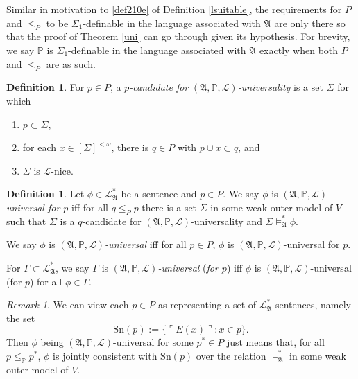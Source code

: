 \documentclass[12pt, twoside]{memoir}
\numberwithin{equation}{section}
\theoremstyle{definition}
\newtheorem{defi}[thm]{Definition}
\theoremstyle{remark}
\newtheorem{rem}[thm]{Remark}
\theoremstyle{definition}
\theoremstyle{definition}
\theoremstyle{definition}
\theoremstyle{remark}
\begin{document}
Similar in motivation to \ref{def210e} of Definition \ref{lsuitable}, the requirements for $P$ and $\leq_P$ to be $\Sigma_1$-definable in the language associated with $\mathfrak{A}$ are only there so that the proof of Theorem \ref{uni} can go through given its hypothesis. For brevity, we say $\mathbb{P}$ is $\Sigma_1$-definable in the language associated with $\mathfrak{A}$ exactly when both $P$ and $\leq_P$ are as such.

\begin{defi}
For $p \in P$, a $p$\emph{-candidate for} $(\mathfrak{A}, \mathbb{P}, \mathcal{L})$\emph{-universality} is a set $\Sigma$ for which
\begin{enumerate}[label=(\alph*)]
   \item $p \subset \Sigma$,
   \item for each $x \in [\Sigma]^{<\omega}$, there is $q \in P$ with $p \cup x \subset q$, and 
   \item $\Sigma$ is $\mathcal{L}$-nice.
\end{enumerate}
\end{defi}

\begin{defi}
Let $\phi \in \mathcal{L}^{*}_{\mathfrak{A}}$ be a sentence and $p \in P$. We say $\phi$ is $(\mathfrak{A}, \mathbb{P}, \mathcal{L})$\emph{-universal for $p$} iff for all $q \leq_P p$ there is a set $\Sigma$ in some weak outer model of $V$ such that $\Sigma$ is a $q$-candidate for $(\mathfrak{A}, \mathbb{P}, \mathcal{L})$-universality and $\Sigma \models^*_{\mathfrak{A}} \phi$.

We say $\phi$ is $(\mathfrak{A}, \mathbb{P}, \mathcal{L})$\emph{-universal} iff for all $p \in P$, $\phi$ is $(\mathfrak{A}, \mathbb{P}, \mathcal{L})$-universal for $p$. 

For $\Gamma \subset \mathcal{L}^{*}_{\mathfrak{A}}$, we say $\Gamma$ is $(\mathfrak{A}, \mathbb{P}, \mathcal{L})$\emph{-universal} (\emph{for $p$}) iff $\phi$ is $(\mathfrak{A}, \mathbb{P}, \mathcal{L})$-universal (for $p$) for all $\phi \in \Gamma$.
\end{defi}

\begin{rem}\label{rem341}
We can view each $p \in P$ as representing a set of $\mathcal{L}^{*}_{\mathfrak{A}}$ sentences, namely the set
\begin{equation*}
    \mathrm{Sn}(p) := \{\ulcorner E(x) \urcorner : x \in p\} \text{.}
\end{equation*}
Then $\phi$ being $(\mathfrak{A}, \mathbb{P}, \mathcal{L})$-universal for some $p^* \in P$ just means that, for all $p \leq_{\mathbb{P}} p^*$, $\phi$ is jointly consistent with $\mathrm{Sn}(p)$ over the relation $\models^{*}_{\mathfrak{A}}$ in some weak outer model of $V$.
\end{rem}
\end{document}
